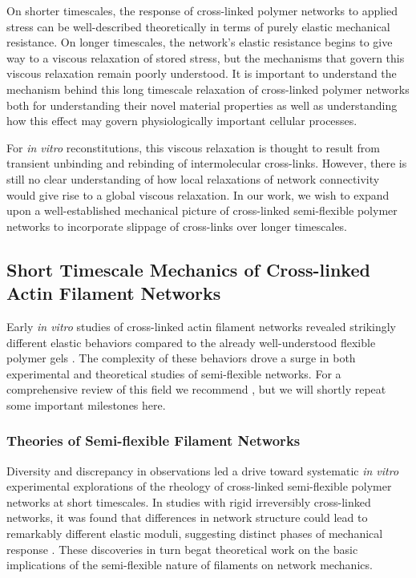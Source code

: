 \documentclass[pre,preprint]{revtex4-1}
\begin{document}
On shorter timescales, the response of cross-linked polymer networks to applied stress can be well-described theoretically in terms of purely elastic mechanical resistance.  On longer timescales, the network's elastic resistance begins to give way to a viscous relaxation of stored stress, but the mechanisms that govern this viscous relaxation remain poorly understood.   It is important to understand the mechanism behind this long timescale relaxation of cross-linked polymer networks both for understanding their novel material properties as well as understanding how this effect may govern physiologically important cellular processes\cite{cell_rheo}.


For {\em in vitro} reconstitutions, this viscous relaxation is thought to result from transient unbinding and rebinding of intermolecular cross-links\cite{rheo_crosslinksmatter,theo_crosslinkslip1}. However, there is still no clear understanding of how local relaxations of network connectivity would give rise to a global viscous relaxation.  In our work, we wish to expand upon a well-established mechanical picture of cross-linked semi-flexible polymer networks to incorporate slippage of cross-links over longer timescales.  


\subsection{Short Timescale Mechanics of Cross-linked Actin Filament Networks}


Early {\em in vitro}  studies of cross-linked actin filament networks revealed strikingly different elastic behaviors compared to the already well-understood flexible polymer gels \cite{rheo_bench}.  The complexity of these behaviors drove a surge in both experimental and theoretical studies of semi-flexible networks.  For a comprehensive review of this field we recommend \cite{megareview}, but we will shortly repeat some important milestones here.

\subsubsection{Theories of Semi-flexible Filament Networks}
 
Diversity and discrepancy in observations led a drive toward systematic {\em in vitro} experimental explorations of the rheology of cross-linked semi-flexible polymer networks at short timescales.  In studies with rigid irreversibly cross-linked networks, it was found that differences in network structure could lead to remarkably different elastic moduli, suggesting distinct phases of mechanical response \cite{rheo_marge}.  These discoveries in turn begat theoretical work on the basic implications of the semi-flexible nature of filaments on network mechanics.  
\end{document}
